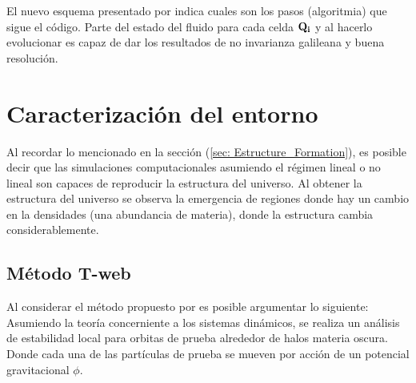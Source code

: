 El nuevo esquema presentado por \cite{springel2010} indica cuales son los pasos (algoritmia) que sigue el código. Parte del estado del fluido para cada celda ${\bf{Q_{i}}}$ y al hacerlo evolucionar es capaz de dar los resultados de no invarianza galileana y buena resolución. 

\section{Caracterización del entorno}
\label{sec: Caracterizacion entorno}

Al recordar lo mencionado en la sección (\ref{sec: Estructure_Formation}), es posible decir que las simulaciones computacionales asumiendo el régimen lineal o no lineal son capaces de reproducir la estructura del universo. Al obtener la estructura del universo se observa la emergencia de regiones donde hay un cambio en la densidades (una abundancia de materia), donde la estructura cambia considerablemente.

    \subsection{Método T-web}
    \label{subsec: Metodo_T-web}
Al considerar el método propuesto por \cite{hahn2007} es posible argumentar lo siguiente: Asumiendo la teoría concerniente a los sistemas dinámicos, se realiza un análisis de estabilidad local para orbitas de prueba alrededor de halos materia oscura. Donde cada una de las partículas de prueba se mueven por acción de un potencial gravitacional $\phi$.

